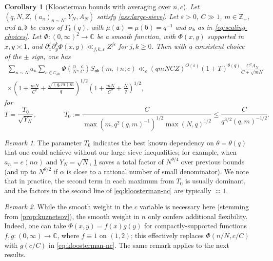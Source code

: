 \documentclass[reqno,11pt]{amsart}
\newtheorem{corollary}[theorem]{Corollary}
\theoremstyle{remark}
\newtheorem*{remark}{Remark}
\numberwithin{equation}{section}
\newcommand{\Z}{\mathbb{Z}}
\newcommand{\C}{\mathbb{C}}
\newcommand{\mC}{\mathcal{C}}
\newcommand{\ma}{\mathfrak{a}}
\newcommand{\mb}{\mathfrak{b}}
\newcommand{\eps}{\varepsilon}
\begin{document}
\begin{corollary}[Kloosterman bounds with averaging over $n, c$] \label{cor:kloosterman-averaging-nc}
Let $(q, N, Z, (a_n)_{n \sim N}, Y_N, A_N)$ satisfy \cref{ass:large-sieve}. Let $\eps > 0$, $C \gg 1$, $m \in \Z_+$, and $\ma, \mb$ be cusps of $\Gamma_0(q)$, with $\mu(\ma) = \mu(\mb) = q^{-1}$ and $\sigma_{\mb}$ as in \cref{eq:scaling-choices}. Let $\Phi : (0, \infty)^2 \to \C$ be a smooth function, with $\Phi(x, y)$ supported in $x, y \asymp 1$, and $\partial_x^j \partial_y^k \Phi(x, y) \ll_{j,k,\eps} Z^{j\eps}$ for $j, k \ge 0$. Then with a consistent choice of the $\pm$ sign, one has
\begin{equation} \label{eq:kloosterman-nc}
\begin{aligned}
    \sum_{n \sim N} a_n
    \sum_{c \in \mC_{\ma\mb}} \Phi\left(\frac{n}{N}, \frac{c}{C}\right) S_{\ma\mb}(m, \pm n; c)
    \ll_\eps
    (qmNCZ)^{O(\eps)}
    \left(1 + T\right)^{\theta(q)}
    \frac{C^2 A_N}{C + \sqrt{mN}} 
    \\
    \times 
    \left(1 + \frac{mN}{C^2} +\frac{\sqrt{(q,m)m}}{q} \right)^{1/2}
    \left(1 + \frac{mN}{C^2} + \frac{N}{q}\right)^{1/2}
    ,
\end{aligned}
\end{equation}
for
\[
    T = \frac{T_0}{\sqrt{Y_N}}, 
    \qquad\qquad 
    T_0 := \frac{C}{\max\left(m, q^2 (q, m)^{-1} \right)^{1/2}\max\left(N, q\right)^{1/2}}
    \le
    \frac{C}{q^{3/2} (q,m)^{-1/2}}.
\]
\end{corollary}


\begin{remark}
The parameter $T_0$ indicates the best known dependency on $\theta = \theta(q)$ that one could achieve without our large sieve inequalities; for example, when $a_n = e(n\alpha)$ and $Y_N = \sqrt{N}$, \cref{cor:kloosterman-averaging-nc} saves a total factor of $N^{\theta/4}$ over previous bounds (and up to $N^{\theta/2}$ if $\alpha$ is close to a rational number of small denominator). We note that in practice, the second term in each maximum from $T_0$ is usually dominant, and the factors in the second line of \cref{eq:kloosterman-nc} are typically $\asymp 1$. 
\end{remark}

\begin{remark}
While the smooth weight in the $c$ variable is necessary here (stemming from \cref{prop:kuznetsov}), the smooth weight in $n$ only confers additional flexibility. Indeed, one can take $\Phi(x, y) = f(x) g(y)$ for compactly-supported functions $f, g : (0, \infty) \to \C$, where $f \equiv 1$ on $(1, 2)$; this effectively replaces $\Phi(n/N, c/C)$ with $g(c/C)$ in \cref{eq:kloosterman-nc}. The same remark applies to the next results.
\end{remark}
\end{document}
